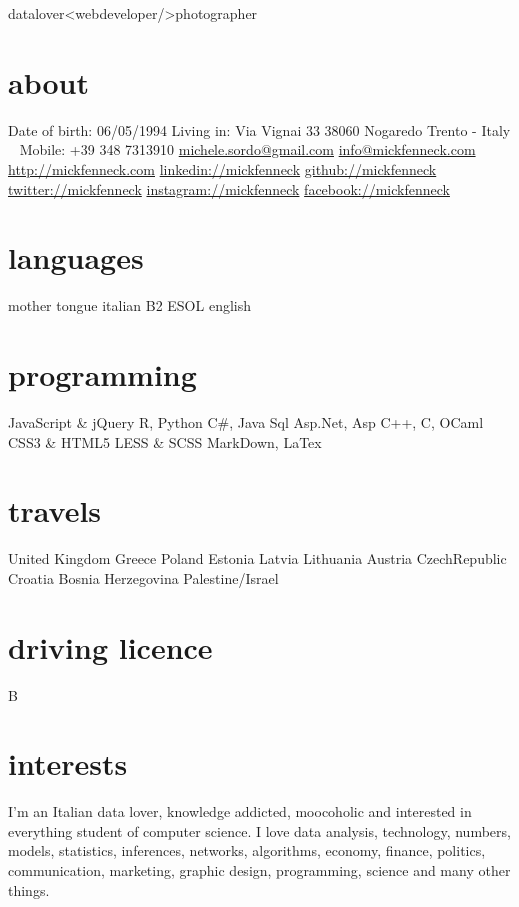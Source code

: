 \documentclass[]{friggeri-cv}
\begin{document}
       {datalover<webdeveloper/>photographer}


\begin{aside}
  \section{about}
    Date of birth:
    06/05/1994
    Living in:
    Via Vignai 33
    38060 Nogaredo
    Trento - Italy
    ~
    Mobile: +39 348 7313910
    \href{mailto:michele.sordo@gmail.com}{michele.sordo@gmail.com}
    \href{mailto:info@mickfenneck.com}{info@mickfenneck.com}
    \href{http://mickfenneck.com}{http://mickfenneck.com}
    \href{http://linkedin.com/in/mickfenneck}{linkedin://mickfenneck}
    \href{http://github.com/mickfenneck}{github://mickfenneck}
    \href{http://twitter.com/mickfenneck}{twitter://mickfenneck}
    \href{http://instagram.com/mickfenneck}{instagram://mickfenneck}
    \href{http://facebook.com/mickfenneck}{facebook://mickfenneck}
  \section{languages}
    mother tongue italian
    B2 ESOL english
  \section{programming}
    JavaScript \& jQuery
    R, Python
    C\#, Java
    Sql
    Asp.Net, Asp
    C++, C, OCaml
    CSS3 \& HTML5
    LESS \& SCSS
    MarkDown, LaTex
\section{travels}
    United Kingdom
    Greece
    Poland
    Estonia
    Latvia
    Lithuania
    Austria
    CzechRepublic
    Croatia
    Bosnia Herzegovina
    Palestine/Israel
\section{driving licence}
    B
\end{aside}






\section{interests}

I'm an Italian data lover, knowledge addicted, moocoholic and interested in everything student of computer science.
I love data analysis, technology, numbers, models, statistics, inferences, networks, algorithms, economy, finance, politics, communication, marketing, graphic design, programming, science and many other things.
\end{document}
